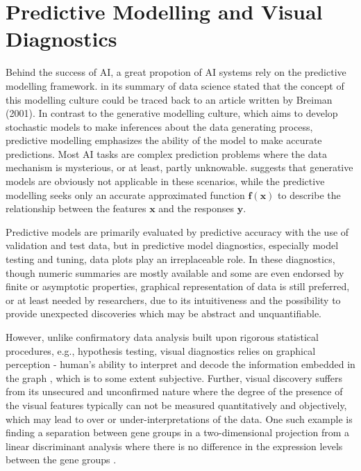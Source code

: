 \documentclass{monashthesis}
\theoremstyle{definition}
\theoremstyle{definition}
\theoremstyle{definition}
\theoremstyle{definition}
\theoremstyle{remark}
\begin{document}
\hypertarget{predictive-modelling-and-visual-diagnostics}{%
\section{Predictive Modelling and Visual Diagnostics}\label{predictive-modelling-and-visual-diagnostics}}

Behind the success of AI, a great propotion of AI systems rely on the predictive modelling framework. \textcite{donoho_50_2017} in its summary of data science stated that the concept of this modelling culture could be traced back to an article written by Breiman (2001). In contrast to the generative modelling culture, which aims to develop stochastic models to make inferences about the data generating process, predictive modelling emphasizes the ability of the model to make accurate predictions. Most AI tasks are complex prediction problems where the data mechanism is mysterious, or at least, partly unknowable. \textcite{breiman_statistical_2001} suggests that generative models are obviously not applicable in these scenarios, while the predictive modelling seeks only an accurate approximated function \(\boldsymbol{f}(\boldsymbol{x})\) to describe the relationship between the features \(\boldsymbol{x}\) and the responses \(\boldsymbol{y}\).

Predictive models are primarily evaluated by predictive accuracy with the use of validation and test data, but in predictive model diagnostics, especially model testing and tuning, data plots play an irreplaceable role. In these diagnostics, though numeric summaries are mostly available and some are even endorsed by finite or asymptotic properties, graphical representation of data is still preferred, or at least needed by researchers, due to its intuitiveness and the possibility to provide unexpected discoveries which may be abstract and unquantifiable.

However, unlike confirmatory data analysis built upon rigorous statistical procedures, e.g., hypothesis testing, visual diagnostics relies on graphical perception - human's ability to interpret and decode the information embedded in the graph \autocite{cleveland_graphical_1984}, which is to some extent subjective. Further, visual discovery suffers from its unsecured and unconfirmed nature where the degree of the presence of the visual features typically can not be measured quantitatively and objectively, which may lead to over or under-interpretations of the data. One such example is finding a separation between gene groups in a two-dimensional projection from a linear discriminant analysis where there is no difference in the expression levels between the gene groups \autocite{roy_chowdhury_using_2015}.
\end{document}
